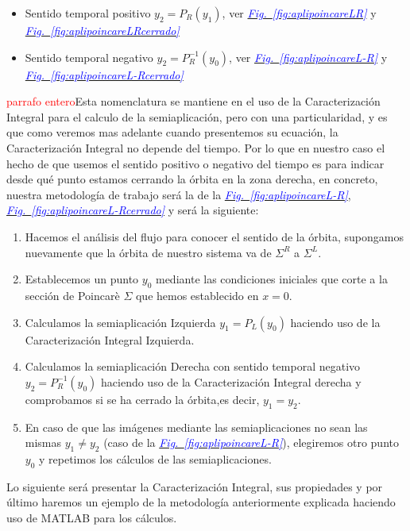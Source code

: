 \documentclass[12pt,a4paper]{report} %
\newcommand{\fref}[1]{\hyperref[#1]{\textcolor{blue}{\textit{Fig.~\ref*{#1}}}}}
\begin{document}
	\begin{itemize}
		\item Sentido temporal positivo $y_2=P_R(y_1)$, ver \fref{fig:aplipoincareLR} y \fref{fig:aplipoincareLRcerrado}
		\item Sentido temporal negativo $y_2=P_R^{-1}(y_0)$, ver \fref{fig:aplipoincareL-R} y \fref{fig:aplipoincareL-Rcerrado}
	\end{itemize}
	
	\noindent \textcolor{red}{parrafo entero}Esta nomenclatura se mantiene en el uso de la Caracterización Integral para el calculo de la semiaplicación, pero con una particularidad, y es que como veremos mas adelante cuando presentemos su ecuación, la Caracterización Integral no depende del tiempo. Por lo que en nuestro caso el hecho de que usemos el sentido positivo o negativo del tiempo es para indicar desde qué punto estamos cerrando la órbita en la zona derecha, en concreto, nuestra metodología de trabajo será la de la \fref{fig:aplipoincareL-R}, \fref{fig:aplipoincareL-Rcerrado} y será la siguiente:
	
	\begin{enumerate}
		\item Hacemos el análisis del flujo para conocer el sentido de la órbita, supongamos nuevamente que la órbita de nuestro sistema va de $\varSigma^R$ a $\varSigma^L$.
		\item Establecemos un punto $y_0$ mediante las condiciones iniciales que corte a la sección de Poincarè $\varSigma$ que hemos establecido en $x=0$.
		\item Calculamos la semiaplicación Izquierda $y_1=P_L(y_0)$ haciendo uso de la Caracterización Integral Izquierda.
		\item Calculamos la semiaplicación Derecha con sentido temporal negativo $y_2=P_R^{-1}(y_0)$ haciendo uso de la Caracterización Integral derecha y comprobamos si se ha cerrado la órbita,es decir, $y_1=y_2$.
		\item En caso de que las imágenes mediante las semiaplicaciones no sean las mismas $y_1\neq y_2$ (caso de la \fref{fig:aplipoincareL-R}), elegiremos otro punto $y_0$ y repetimos los cálculos de las semiaplicaciones.
	\end{enumerate}
	
	\vspace{0.5cm}Lo siguiente será presentar la Caracterización Integral, sus propiedades y por último haremos un ejemplo de la metodología anteriormente explicada haciendo uso de MATLAB para los cálculos.
	
\end{document}
